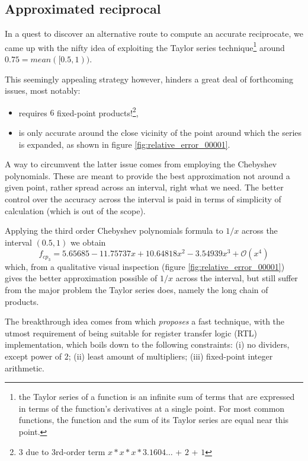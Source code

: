 \subsection{Approximated reciprocal}

In a quest to discover an alternative route to compute an accurate reciprocate, we came up with the nifty idea of exploiting the Taylor series technique\footnote{the Taylor series of a function is an infinite sum of terms that are expressed in terms of the function's derivatives at a single point. For most common functions, the function and the sum of its Taylor series are equal near this point.} around $ 0.75 = mean([0.5, 1))$.


This seemingly appealing strategy however, hinders a great deal of forthcoming issues, most notably:
\begin{itemize}
\item requires $6$ fixed-point products!\footnote{$3$ due to 3rd-order term $x*x*x*3.1604\dots$ + $2$ + $1$},
\item is only accurate around the close vicinity of the point around which the series is expanded, as shown in figure \ref{fig:relative_error_00001}.
\end{itemize}
A way to circumvent the latter issue comes from employing the Chebyshev polynomials. These are meant to provide the best approximation not around a given point, rather spread across an interval, right what we need.
The better control over the accuracy across the interval is paid in terms of simplicity of calculation (which is out of the scope).


Applying the third order Chebyshev polynomials formula to $1/x$ across the interval $(0.5, 1)$ we obtain
\begin{equation}\label{equ:3rd_order_Chebyshev_polynomial_equation}
f_{cp_3} = 5.65685 - 11.75737x + 10.64818x^2 - 3.54939 x^3 + \mathcal{O}(x^4)
\end{equation}
which, from a qualitative visual inspection (figure \ref{fig:relative_error_00001}) gives the better approximation possible of $1/x$ across the interval, but still suffer from the major problem the Taylor series does, namely the long chain of products.

The breakthrough idea comes from \cite{drom} which \textit{proposes} a fast technique, with the utmost requirement of being suitable for register transfer logic (RTL) implementation, which boils down to the following constraints: (i) no dividers, except power of $2$; (ii) least amount of multipliers; (iii) fixed-point integer arithmetic.


